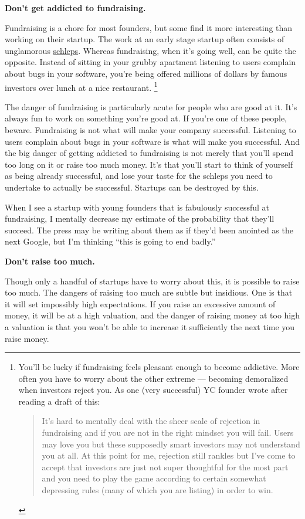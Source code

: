 \documentclass[12pt]{book}
\begin{document}
\textbf{Don't get addicted to fundraising.}

Fundraising is a chore for most founders, but some find it more
interesting than working on their startup. The work at an early stage
startup often consists of unglamorous \href{schlep.html}{schleps}.
Whereas fundraising, when it's going well, can be quite the opposite.
Instead of sitting in your grubby apartment listening to users complain
about bugs in your software, you're being offered millions of dollars by
famous investors over lunch at a nice restaurant.
\footnote{You'll be lucky if fundraising feels pleasant enough to become
addictive. More often you have to worry about the other extreme ---
becoming demoralized when investors reject you. As one (very successful)
YC founder wrote after reading a draft of this:

\begin{quote}
It's hard to mentally deal with the sheer scale of rejection in
fundraising and if you are not in the right mindset you will fail. Users
may love you but these supposedly smart investors may not understand you
at all. At this point for me, rejection still rankles but I've come to
accept that investors are just not super thoughtful for the most part
and you need to play the game according to certain somewhat depressing
rules (many of which you are listing) in order to win.
\end{quote}}

The danger of fundraising is particularly acute for people who are good
at it. It's always fun to work on something you're good at. If you're
one of these people, beware. Fundraising is not what will make your
company successful. Listening to users complain about bugs in your
software is what will make you successful. And the big danger of getting
addicted to fundraising is not merely that you'll spend too long on it
or raise too much money. It's that you'll start to think of yourself as
being already successful, and lose your taste for the schleps you need
to undertake to actually be successful. Startups can be destroyed by
this.

When I see a startup with young founders that is fabulously successful
at fundraising, I mentally decrease my estimate of the probability that
they'll succeed. The press may be writing about them as if they'd been
anointed as the next Google, but I'm thinking ``this is going to end
badly.''

\textbf{Don't raise too much.}

Though only a handful of startups have to worry about this, it is
possible to raise too much. The dangers of raising too much are subtle
but insidious. One is that it will set impossibly high expectations. If
you raise an excessive amount of money, it will be at a high valuation,
and the danger of raising money at too high a valuation is that you
won't be able to increase it sufficiently the next time you raise money.
\end{document}
